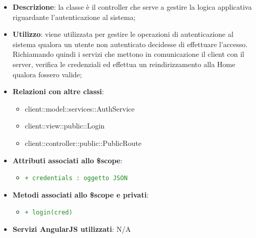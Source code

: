 			\begin{itemize}
				\item \textbf{Descrizione}: la classe è il controller che serve a gestire la logica applicativa riguardante l'autenticazione al sistema;
				\item \textbf{Utilizzo}: viene utilizzata per gestire le operazioni di autenticazione al sistema qualora un utente non autenticato decidesse di effettuare l'accesso. Richiamando quindi i servizi che mettono in comunicazione il client con il server, verifica le credenziali ed effettua un reindirizzamento alla Home qualora fossero valide;
				\item \textbf{Relazioni con altre classi}:
					\begin{itemize}
						\item client::model::services::AuthService
						\item client::view::public::Login
						\item client::controller::public::PublicRoute
					\end{itemize}

				\item \textbf{Attributi associati allo \$scope}:
					\begin{itemize}

						\item \textcolor{forestgreen}{\texttt{+ credentials : oggetto JSON}}

					\end{itemize}

				\item \textbf{Metodi associati allo \$scope e privati}:
					\begin{itemize}
						\item \textcolor{forestgreen}{\texttt{+ login(cred)}}

					\end{itemize}

				\item \textbf{Servizi AngularJS utilizzati}: N/A

			\end{itemize}


